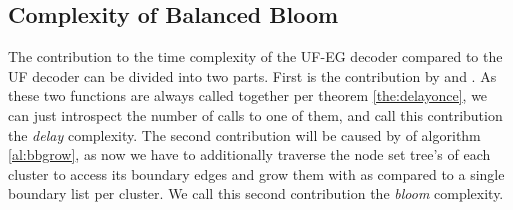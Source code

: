 \begin{algo}[algotitle=UFBalancedBloom, label=al:ufbb]
\begin{algorithm}[H]

\KwData{\buckets}

\BlankLine

\end{algorithm}
\end{algo}


\subsection{Complexity of Balanced Bloom}\label{sec:ufbbcomplexity}

The contribution to the time complexity of the UF-EG decoder compared to the UF decoder can be divided into two parts. First is the contribution by  and . As these two functions are always called together per theorem \ref{the:delayonce}, we can just introspect the number of calls to one of them, and call this contribution the \emph{delay} complexity. The second contribution will be caused by  of algorithm \ref{al:bbgrow}, as now we have to additionally traverse the node set tree's of each cluster to access its boundary edges and grow them with  as compared to a single boundary list per cluster. We call this second contribution the \emph{bloom} complexity.

